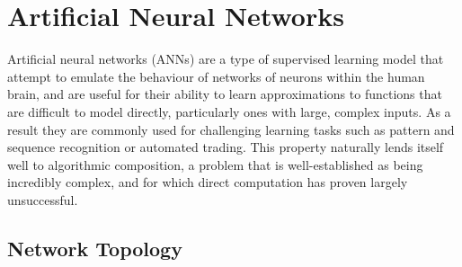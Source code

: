 \documentclass[ author={Stephen Livermore-Tozer},
				supervisor={Dr. Peter Flach},
				degree={MEng},
				title={Algorithmic Co-composition Using Machine Learning},
				subtitle={},
				type={research},
				year={2016} ]{dissertation}
\begin{document}
%	
%	
%	

	\section{Artificial Neural Networks}
	\label{sec:ann-overview}
	
	Artificial neural networks (ANNs) are a type of supervised learning model that attempt to emulate the behaviour of networks of neurons within the human brain, and are useful for their ability to learn approximations to functions that are difficult to model directly, particularly ones with large, complex inputs. As a result they are commonly used for challenging learning tasks such as pattern and sequence recognition or automated trading. This property naturally lends itself well to algorithmic composition, a problem that is well-established as being incredibly complex, and for which direct computation has proven largely unsuccessful. 
	
	\subsection{Network Topology}
	
\end{document}
